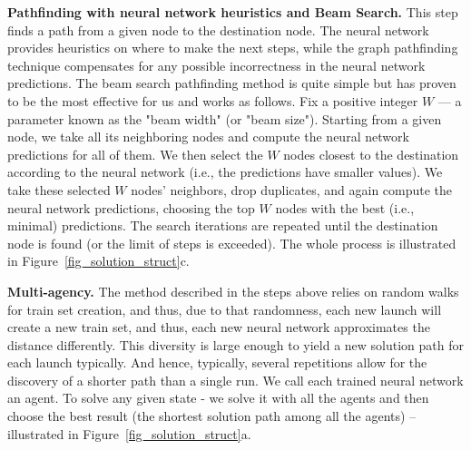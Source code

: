    
 {\bf Pathfinding with neural network heuristics and Beam Search.} This step finds a path from a given node to the destination node. The neural network provides heuristics on where to make the next steps, while the graph pathfinding technique compensates for any possible incorrectness in the neural network predictions. The beam search pathfinding method is quite simple but has proven to be the most effective for us and works as follows. Fix a positive integer $W$ — a parameter known as the "beam width" (or "beam size"). Starting from a given node, we take all its neighboring nodes and compute the neural network predictions for all of them. We then select the $W$ nodes closest to the destination according to the neural network (i.e., the predictions have smaller values). We take these selected $W$ nodes' neighbors, drop duplicates, and again compute the neural network predictions, choosing the top $W$ nodes with the best (i.e., minimal) predictions. The search iterations are repeated until the destination node is found (or the limit of steps is exceeded). The whole process is illustrated in Figure~\ref{fig_solution_struct}c.
  
 {\bf Multi-agency.} The method described in the steps above relies on random walks for train set creation, and thus, due to that randomness, each new launch will create a new train set, and thus, each new neural network approximates the distance differently. This diversity is large enough to yield a new solution path for each launch typically. And hence, typically, several repetitions allow for the discovery of a shorter path than a single run. We call each trained neural network an agent. To solve any given state - we solve it with all the agents and then choose the best result (the shortest solution path among all the agents) -- illustrated in Figure~\ref{fig_solution_struct}a. 
